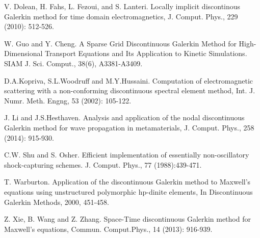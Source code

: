 \documentclass[final,leqno]{siamltex704}
\begin{document}
\begin{thebibliography}{99}
V. Dolean, H. Fahs, L. Fezoui, and S. Lanteri. Locally implicit discontinous Galerkin method for time domain electromagnetics, J. Comput. Phys., 229 (2010): 512-526.

W. Guo and Y. Cheng. A Sparse Grid Discontinuous Galerkin Method for High-Dimensional Transport Equations and Its Application to Kinetic Simulations. SIAM J. Sci. Comput., 38(6), A3381-A3409. 

D.A.Kopriva, S.L.Woodruff and M.Y.Hussaini. Computation of electromagnetic scattering with a non-conforming discontinuous spectral element method, Int. J. Numr. Meth. Engng, 53 (2002): 105-122.

J. Li and J.S.Hesthaven. Analysis and application of the nodal discontinuous Galerkin method for wave propagation in metamaterials, J. Comput. Phys., 258 (2014): 915-930.

C.W. Shu and S. Osher. Efficient implementation of essentially non-oscillatory shock-capturing schemes. J. Comput.
Phys., 77 (1988):439-471.


T. Warburton. Application of the discontinuous Galerkin method to Maxwell's equations using unstructured polymorphic hp-dinite elements, In Discontinuous Galerkin Methods, 2000, 451-458.

Z. Xie, B. Wang and Z. Zhang. Space-Time discontinuous Galerkin method for Maxwell's equations, Commun. Comput.Phys., 14 (2013): 916-939.



\end{thebibliography}
\end{document}
